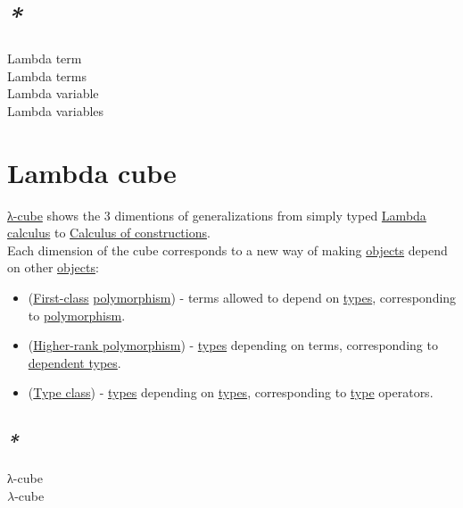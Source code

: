 \documentclass[a4paper,14pt,oneside]{book}
\begin{document}
\section{\emph{*}}
\label{sec:orgd390ab8}

\label{org25a128c}Lambda term\\
\label{org93a3ea2}Lambda terms\\
\label{org5e46511}Lambda variable\\
\label{org4ec7b21}Lambda variables\\

\section{\label{orgf96c5df}Lambda cube}
\label{sec:orgf5dcbaf}
\hyperref[orgf24de6a]{λ-cube} shows the 3 dimentions of generalizations from simply typed \hyperref[org4a72ae8]{Lambda calculus} to \hyperref[orgd0ac3aa]{Calculus of constructions}.\\

Each dimension of the cube corresponds to a new way of making \hyperref[org75bbfb1]{objects} depend on other \hyperref[org75bbfb1]{objects}:\\
\begin{itemize}
\item (\hyperref[org8b4de61]{First-class} \hyperref[org76d930e]{polymorphism}) - terms allowed to depend on \hyperref[orgff9cdcc]{types}, corresponding to \hyperref[org76d930e]{polymorphism}.\\
\item (\hyperref[orgfeb5f08]{Higher-rank polymorphism}) - \hyperref[orgff9cdcc]{types} depending on terms, corresponding to \hyperref[orgb4dbd8e]{dependent types}.\\
\item (\hyperref[org876c934]{Type class}) - \hyperref[orgff9cdcc]{types} depending on \hyperref[orgff9cdcc]{types}, corresponding to \hyperref[orgb064f4e]{type} operators.\\
\end{itemize}

\subsection{\emph{*}}
\label{sec:orgcd2d77b}

\label{orgf24de6a}λ-cube\\
\label{orgc5391db}\(\lambda\)-cube\\
\end{document}
